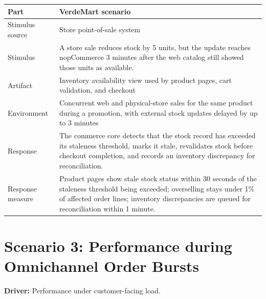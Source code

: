 \begin{center}
\begin{tabular}{|p{}|p{}|}
\hline
\textbf{Part} & \textbf{VerdeMart scenario} \\
\hline
Stimulus source & Store point-of-sale system \\
\hline
Stimulus & A store sale reduces stock by 5 units, but the update reaches nopCommerce 3 minutes after the web catalog still showed those units as available. \\
\hline
Artifact & Inventory availability view used by product pages, cart validation, and checkout \\
\hline
Environment & Concurrent web and physical-store sales for the same product during a promotion, with external stock updates delayed by up to 3 minutes \\
\hline
Response & The commerce core detects that the stock record has exceeded its staleness threshold, marks it stale, revalidates stock before checkout completion, and records an inventory discrepancy for reconciliation. \\
\hline
Response measure & Product pages show stale stock status within 30 seconds of the staleness threshold being exceeded; overselling stays under 1\% of affected order lines; inventory discrepancies are queued for reconciliation within 1 minute. \\
\hline
\end{tabular}
\end{center}

\section{Scenario 3: Performance during Omnichannel Order Bursts}

\textbf{Driver:} Performance under customer-facing load.

